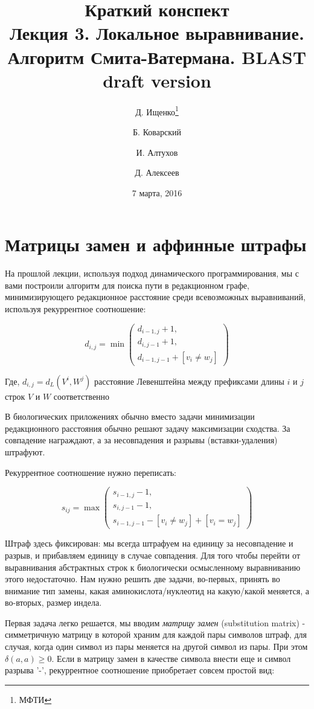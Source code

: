 \documentclass[letterpaper, 11pt]{article}
\title{\large{Краткий конспект}\\
\LARGE{Лекция 3. Локальное выравнивание. Алгоритм Смита-Ватермана. BLAST}\\
\textcolor{NavyBlue}{draft version}}
\date{7 марта, 2016}
\author{Д. Ищенко\thanks{МФТИ} \and Б. Коварский\footnotemark[1]
\and И. Алтухов\footnotemark[1] \and Д. Алексеев\footnotemark[1]}
\begin{document}
\maketitle
\thispagestyle{empty}
\clearpage

\section{Матрицы замен и аффинные штрафы}

На прошлой лекции, используя подход динамического программирования, мы с вами построили алгоритм для поиска пути в редакционном графе, минимизирующего редакционное расстояние среди всевозможных выравниваний, используя рекуррентное соотношение:

$$d_{i,j}=
\min
\begin{pmatrix}
	d_{i-1,j}+1, \\
	d_{i,j-1}+1, \\
	d_{i-1,j-1}+[v_i\ne w_j]
\end{pmatrix}$$

Где, $d_{i,j}=d_L(V^i,W^j)$ расстояние Левенштейна между префиксами длины $i$ и $j$ строк $V$ и $W$ соответственно

В биологических приложениях обычно вместо задачи минимизации редакционного расстояния обычно решают задачу максимизации сходства. За совпадение награждают, а за несовпадения и разрывы (вставки-удаления) штрафуют.

Рекуррентное соотношение нужно переписать:

$$s_{ij}=
\max
\begin{pmatrix}
	s_{i-1,j}-1, \\
	s_{i,j-1}-1, \\
	s_{i-1,j-1}-[v_i\ne w_j]+[v_i = w_j]
\end{pmatrix}$$

Штраф здесь фиксирован: мы всегда штрафуем на единицу за несовпадение и разрыв, и прибавляем единицу в случае совпадения. Для того чтобы перейти от выравнивания абстрактных строк к биологически осмысленному выравниванию этого недостаточно. Нам нужно решить две задачи, во-первых, принять во внимание тип замены, какая аминокислота/нуклеотид на какую/какой меняется, а во-вторых, размер индела.

Первая задача легко решается, мы вводим \textit{матрицу замен} (substitution matrix) - симметричную матрицу в которой храним для каждой пары символов штраф, для случая, когда один символ из пары меняется на другой символ из пары. При этом $\delta(a,a)\ge 0$. Если в матрицу замен в качестве символа внести еще и символ разрыва '-', рекуррентное соотношение приобретает совсем простой вид:
\end{document}
